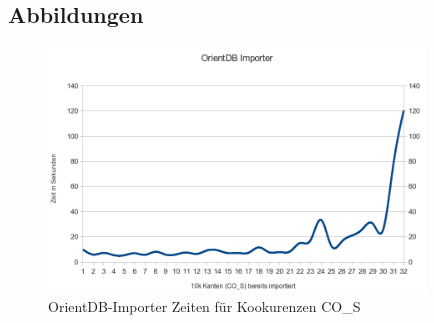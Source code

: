\documentclass[11pt, a4paper, oneside]{article} %
\begin{document}
\begin{appendix}
\section{Abbildungen}

\begin{figure}[htbp]
	\centering
	\includegraphics[width=10cm]{OrientImporter.png} 
	\caption{OrientDB-Importer Zeiten für Kookurenzen CO\_{}S}
	\label{fig:orientdb_import}
\end{figure}

\begin{landscape} 
	\newpage
	\thispagestyle{empty}
	

\end{landscape}
\end{appendix}
\end{document}
